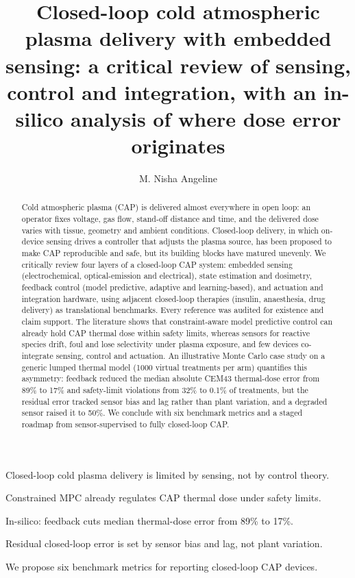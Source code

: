 \documentclass[preprint,review,12pt,authoryear]{elsarticle}
\begin{document}
\begin{frontmatter}

\title{Closed-loop cold atmospheric plasma delivery with embedded sensing: a critical review of sensing, control and integration, with an in-silico analysis of where dose error originates}

\author{M. Nisha Angeline}

\begin{abstract}
Cold atmospheric plasma (CAP) is delivered almost everywhere in open loop: an operator fixes voltage, gas flow, stand-off distance and time, and the delivered dose varies with tissue, geometry and ambient conditions. Closed-loop delivery, in which on-device sensing drives a controller that adjusts the plasma source, has been proposed to make CAP reproducible and safe, but its building blocks have matured unevenly. We critically review four layers of a closed-loop CAP system: embedded sensing (electrochemical, optical-emission and electrical), state estimation and dosimetry, feedback control (model predictive, adaptive and learning-based), and actuation and integration hardware, using adjacent closed-loop therapies (insulin, anaesthesia, drug delivery) as translational benchmarks. Every reference was audited for existence and claim support. The literature shows that constraint-aware model predictive control can already hold CAP thermal dose within safety limits, whereas sensors for reactive species drift, foul and lose selectivity under plasma exposure, and few devices co-integrate sensing, control and actuation. An illustrative Monte Carlo case study on a generic lumped thermal model (1000 virtual treatments per arm) quantifies this asymmetry: feedback reduced the median absolute CEM43 thermal-dose error from 89\% to 17\% and safety-limit violations from 32\% to 0.1\% of treatments, but the residual error tracked sensor bias and lag rather than plant variation, and a degraded sensor raised it to 50\%. We conclude with six benchmark metrics and a staged roadmap from sensor-supervised to fully closed-loop CAP.
\end{abstract}

\begin{highlights}
\item Closed-loop cold plasma delivery is limited by sensing, not by control theory.
\item Constrained MPC already regulates CAP thermal dose under safety limits.
\item In-silico: feedback cuts median thermal-dose error from 89\% to 17\%.
\item Residual closed-loop error is set by sensor bias and lag, not plant variation.
\item We propose six benchmark metrics for reporting closed-loop CAP devices.
\end{highlights}


\end{frontmatter}
\end{document}
